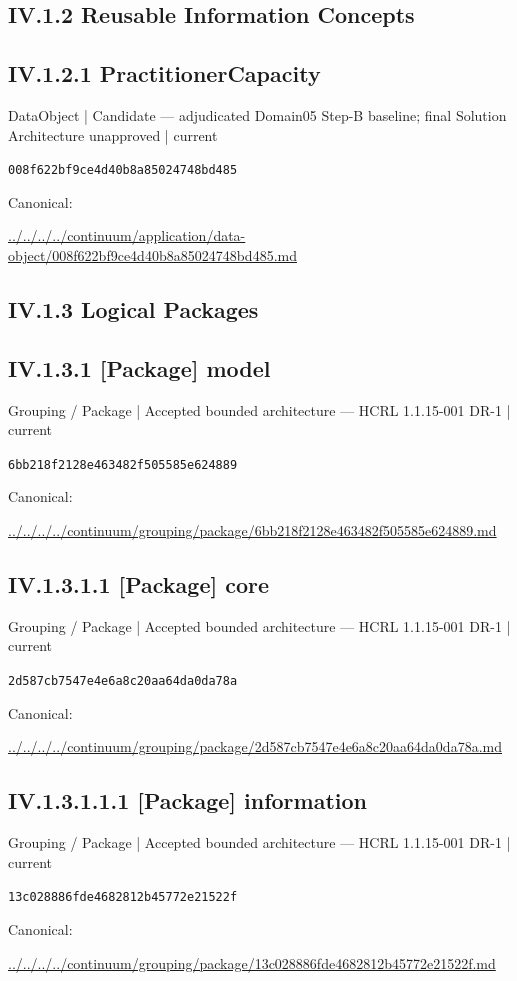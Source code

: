 \documentclass[10pt,a4paper]{article}
\begin{document}
\subsection*{IV.1.2 Reusable Information Concepts}
\subsection*{IV.1.2.1 PractitionerCapacity}
\label{element-008f622bf9ce4d40b8a85024748bd485}
{\small DataObject | Candidate — adjudicated Domain05 Step-B baseline; final Solution Architecture unapproved | current}\par
\texttt{008f622bf9ce4d40b8a85024748bd485}\par
Canonical: \par
{\footnotesize\url{../../../../continuum/application/data-object/008f622bf9ce4d40b8a85024748bd485.md}}\par
\subsection*{IV.1.3 Logical Packages}
\subsection*{IV.1.3.1 [Package] model}
\label{element-6bb218f2128e463482f505585e624889}
{\small Grouping / Package | Accepted bounded architecture — HCRL 1.1.15-001 DR-1 | current}\par
\texttt{6bb218f2128e463482f505585e624889}\par
Canonical: \par
{\footnotesize\url{../../../../continuum/grouping/package/6bb218f2128e463482f505585e624889.md}}\par
\subsection*{IV.1.3.1.1 [Package] core}
\label{element-2d587cb7547e4e6a8c20aa64da0da78a}
{\small Grouping / Package | Accepted bounded architecture — HCRL 1.1.15-001 DR-1 | current}\par
\texttt{2d587cb7547e4e6a8c20aa64da0da78a}\par
Canonical: \par
{\footnotesize\url{../../../../continuum/grouping/package/2d587cb7547e4e6a8c20aa64da0da78a.md}}\par
\subsection*{IV.1.3.1.1.1 [Package] information}
\label{element-13c028886fde4682812b45772e21522f}
{\small Grouping / Package | Accepted bounded architecture — HCRL 1.1.15-001 DR-1 | current}\par
\texttt{13c028886fde4682812b45772e21522f}\par
Canonical: \par
{\footnotesize\url{../../../../continuum/grouping/package/13c028886fde4682812b45772e21522f.md}}\par
\end{document}
